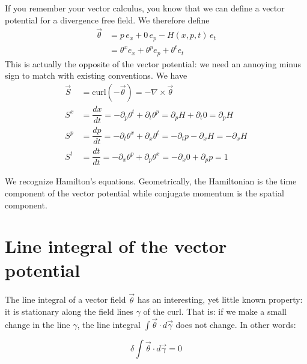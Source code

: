 \documentclass[aps,pra,10pt,floatfix,nofootinbib]{revtex4-1}
\theoremstyle{definition}
\begin{document}
If you remember your vector calculus, you know that we can define a vector potential for a divergence free field. We therefore define
\begin{equation}
\begin{aligned}
\vec{\theta} &= p \, e_x + 0 \, e_p - H(x,p,t) \, e_t \\ 
&= \theta^x e_x + \theta^p e_p + \theta^t e_t 
\end{aligned}
\label{flow}
\end{equation}
This is actually the opposite of the vector potential: we need an annoying minus sign to match with existing conventions. We have
\begin{equation}
\begin{aligned}
\vec{S} &= \mathrm{curl}(-\vec{\theta}) = - \nabla \times \vec{\theta} \\
S^x &= \dfrac{dx}{dt} = - \partial_p \theta^t + \partial_t \theta^p = \partial_p H + \partial_t 0 = \partial_p H \\
S^p &= \dfrac{dp}{dt} = - \partial_t \theta^x + \partial_x \theta^t = -\partial_t p - \partial_x H = - \partial_x H \\
S^t &= \dfrac{dt}{dt} = - \partial_x \theta^p + \partial_p \theta^x = - \partial_x 0 + \partial_p p = 1
\end{aligned}
\label{HamiltonEquations}
\end{equation}

We recognize Hamilton's equations. Geometrically, the Hamiltonian is the time component of the vector potential while conjugate momentum is the spatial component.

\section{Line integral of the vector potential}

The line integral of a vector field $\vec{\theta}$ has an interesting, yet little known property: it is stationary along the field lines $\gamma$ of the curl. That is: if we make a small change in the line $\gamma$, the line integral $\int \vec{\theta} \cdot d\vec{\gamma}$ does not change. In other words:

\begin{equation}
\delta \int \vec{\theta} \cdot d\vec{\gamma} = 0
\label{stationaryLineIntegral}
\end{equation}
\end{document}
